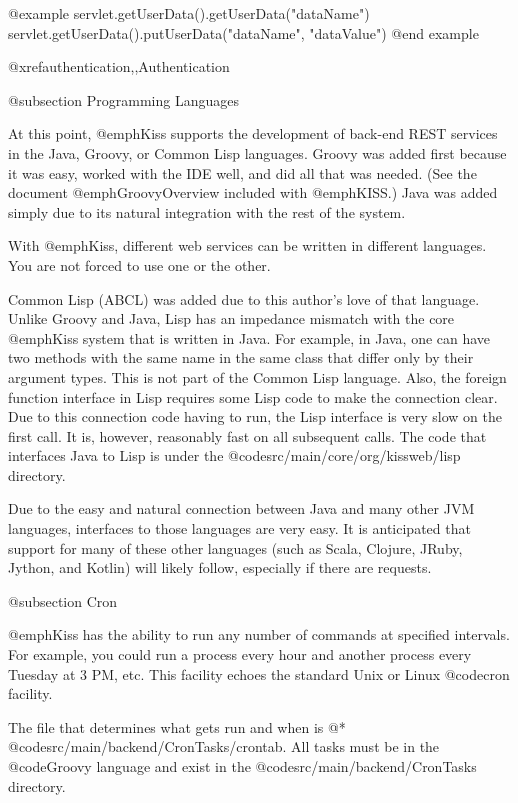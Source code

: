 @example
        servlet.getUserData().getUserData("dataName")
        servlet.getUserData().putUserData("dataName", "dataValue")
@end example

@xref{authentication,,Authentication}

@subsection Programming Languages

At this point, @emph{Kiss} supports the development of back-end REST
services in the Java, Groovy, or Common Lisp languages.  Groovy was
added first because it was easy, worked with the IDE well, and did all
that was needed.  (See the document @emph{GroovyOverview} included
with @emph{KISS}.) Java was added simply due to its natural
integration with the rest of the system.

With @emph{Kiss}, different web services can be written in different
languages.  You are not forced to use one or the other.

Common Lisp (ABCL) was added due to this author's love of that
language.  Unlike Groovy and Java, Lisp has an impedance mismatch with
the core @emph{Kiss} system that is written in Java.  For example, in
Java, one can have two methods with the same name in the same class
that differ only by their argument types.  This is not part of the
Common Lisp language.  Also, the foreign function interface in Lisp
requires some Lisp code to make the connection clear.  Due to this
connection code having to run, the Lisp interface is very slow on the
first call.  It is, however, reasonably fast on all subsequent calls.
The code that interfaces Java to Lisp is under the
@code{src/main/core/org/kissweb/lisp} directory.

Due to the easy and natural connection between Java and many other JVM
languages, interfaces to those languages are very easy.  It is
anticipated that support for many of these other languages (such as
Scala, Clojure, JRuby, Jython, and Kotlin) will likely follow,
especially if there are requests.

@subsection Cron

@emph{Kiss} has the ability to run any number of commands at specified
intervals.  For example, you could run a process every hour and
another process every Tuesday at 3 PM, etc.  This facility echoes 
the standard Unix or Linux @code{cron} facility.

The file that determines what gets run and when is @*
@code{src/main/backend/CronTasks/crontab}.  All tasks must be in
the @code{Groovy} language and exist in the
@code{src/main/backend/CronTasks} directory.

